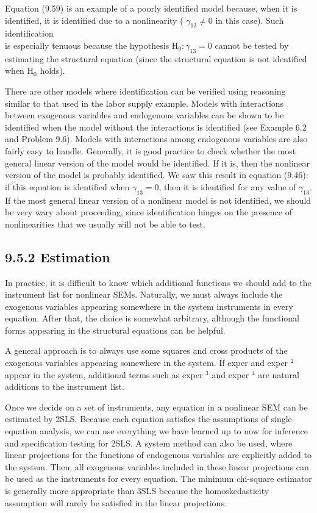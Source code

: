 \documentclass[10pt]{article}
\begin{document}
Equation (9.59) is an example of a poorly identified model because, when it is identified, it is identified due to a nonlinearity ( $\gamma_{13} \neq 0$ in this case). Such identification\\
is especially tenuous because the hypothesis $\mathrm{H}_{0}: \gamma_{13}=0$ cannot be tested by estimating the structural equation (since the structural equation is not identified when $\mathrm{H}_{0}$ holds).

There are other models where identification can be verified using reasoning similar to that used in the labor supply example. Models with interactions between exogenous variables and endogenous variables can be shown to be identified when the model without the interactions is identified (see Example 6.2 and Problem 9.6). Models with interactions among endogenous variables are also fairly easy to handle. Generally, it is good practice to check whether the most general linear version of the model would be identified. If it is, then the nonlinear version of the model is probably identified. We saw this result in equation (9.46): if this equation is identified when $\gamma_{13}=0$, then it is identified for any value of $\gamma_{13}$. If the most general linear version of a nonlinear model is not identified, we should be very wary about proceeding, since identification hinges on the presence of nonlinearities that we usually will not be able to test.

\subsection*{9.5.2 Estimation}
In practice, it is difficult to know which additional functions we should add to the instrument list for nonlinear SEMs. Naturally, we must always include the exogenous variables appearing somewhere in the system instruments in every equation. After that, the choice is somewhat arbitrary, although the functional forms appearing in the structural equations can be helpful.

A general approach is to always use some squares and cross products of the exogenous variables appearing somewhere in the system. If exper and exper ${ }^{2}$ appear in the system, additional terms such as exper ${ }^{3}$ and exper ${ }^{4}$ are natural additions to the instrument list.

Once we decide on a set of instruments, any equation in a nonlinear SEM can be estimated by 2SLS. Because each equation satisfies the assumptions of single-equation analysis, we can use everything we have learned up to now for inference and specification testing for 2SLS. A system method can also be used, where linear projections for the functions of endogenous variables are explicitly added to the system. Then, all exogenous variables included in these linear projections can be used as the instruments for every equation. The minimum chi-square estimator is generally more appropriate than 3SLS because the homoskedasticity assumption will rarely be satisfied in the linear projections.
\end{document}
